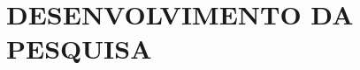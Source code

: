

\section{\textbf{DESENVOLVIMENTO DA PESQUISA}}
    \label{sec:desenvolvimento-da-pesquisa}
    
    
    
    \newpage
